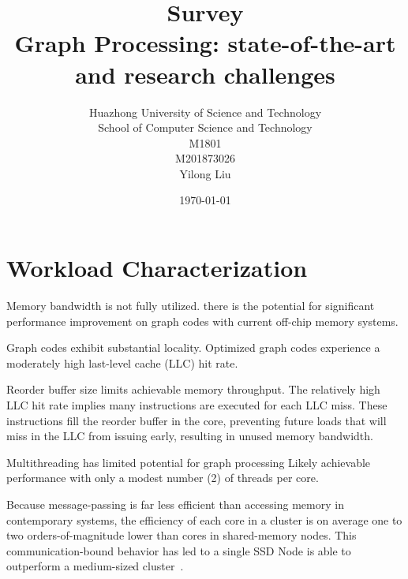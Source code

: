 \documentclass[UTF8,12pt,a4paper]{article}
\title{Survey \\ \bigskip \textbf{Graph Processing: state-of-the-art and research challenges}}
\author{Huazhong University of Science and Technology\\ School of Computer Science and Technology\\ M1801\\ M201873026\\ Yilong Liu}
\date{\today}
\begin{document}
\maketitle
\newpage


\tableofcontents
\newpage


\section{Workload Characterization}
\begin{compactitem}
  \item Memory bandwidth is not fully utilized.
  there is the potential for significant performance improvement
  on graph codes with current off-chip memory systems.
  \item Graph codes exhibit substantial locality.
  Optimized graph codes experience a moderately
  high last-level cache (LLC) hit rate.
  \item Reorder buffer size limits achievable memory throughput.
  The relatively high LLC hit rate implies
  many instructions are executed for each LLC miss.
  These instructions fill the reorder buffer in the core,
  preventing future loads that will miss in the LLC from issuing early,
  resulting in unused memory bandwidth.
  \item Multithreading has limited potential for graph processing
  Likely achievable performance with only a modest number (2) of threads per core.
\end{compactitem}

Because message-passing is far less efficient than accessing memory in contemporary systems,
the efficiency of each core in a cluster is on average
one to two orders-of-magnitude lower than cores in shared-memory nodes.
This communication-bound behavior has led to
a single SSD Node is able to outperform a medium-sized cluster~\cite{DBLP:conf/osdi/KyrolaBG12}.
\end{document}
